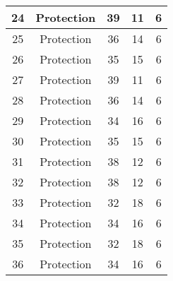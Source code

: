 \documentclass[results.tex]{subfiles}
\begin{document}
\begin{center}
\begin{tabular}{| c || c | c | c | c |}
            \hline
            24                      & Protection                   & 39                     & 11                      & 6                    \\
            \hline
            25                      & Protection                   & 36                     & 14                      & 6                    \\
            \hline
            26                      & Protection                   & 35                     & 15                      & 6                    \\
            \hline
            27                      & Protection                   & 39                     & 11                      & 6                    \\
            \hline
            28                      & Protection                   & 36                     & 14                      & 6                    \\
            \hline
            29                      & Protection                   & 34                     & 16                      & 6                    \\
            \hline
            30                      & Protection                   & 35                     & 15                      & 6                    \\
            \hline
            31                      & Protection                   & 38                     & 12                      & 6                    \\
            \hline
            32                      & Protection                   & 38                     & 12                      & 6                    \\
            \hline
            33                      & Protection                   & 32                     & 18                      & 6                    \\
            \hline
            34                      & Protection                   & 34                     & 16                      & 6                    \\
            \hline
            35                      & Protection                   & 32                     & 18                      & 6                    \\
            \hline
            36                      & Protection                   & 34                     & 16                      & 6                    \\

\end{tabular}
\end{center}
\end{document}
